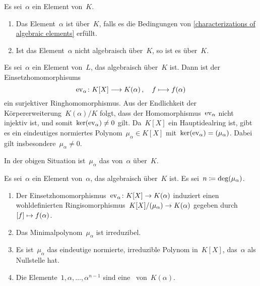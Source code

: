 \begin{definition}
  Es sei~$\alpha$ ein Element von~$K$.
  \begin{enumerate}
    \item
      Das Element~$\alpha$ ist  über~$K$, falls es die Bedingungen von \cref{characterizations of algebraic elements} erfüllt.
    \item
      Ist das Element~$\alpha$ nicht algebraisch über~$K$, so ist es  über~$K$.
  \end{enumerate}
\end{definition}

Es sei~$\alpha$ ein Element von~$L$, das algebraisch über~$K$ ist.
Dann ist der Einsetzhomomorphisums
\[
  \ev_\alpha
  \colon
  K[X] \to K(\alpha) \,,
  \quad
  f \mapsto f(\alpha)
\]
ein surjektiver Ringhomomorphismus.
Aus der Endlichkeit der Körpererweiterung~$K(\alpha)/K$ folgt, dass der Homomorphismus~$\operatorname{ev}_\alpha$ nicht injektiv ist, und somit~$\ker(\operatorname{ev}_\alpha) \neq 0$ gilt.
Da~$K[X]$ ein Hauptidealring ist, gibt es ein eindeutiges normiertes Polynom~$\mu_\alpha \in K[X]$ mit~$\ker(\operatorname{ev}_\alpha) = ( \mu_\alpha )$.
Dabei gilt insbesondere~$\mu_\alpha \neq 0$.

\begin{definition}
  In der obigen Situation ist~$\mu_\alpha$ das  von~$\alpha$ über~$K$.
\end{definition}

\begin{proposition}
  Es sei~$\alpha$ ein Element von~$\alpha$, das algebraisch über~$K$ ist.
  Es sei~$n \coloneqq \deg(\mu_\alpha)$.
  \begin{enumerate}
    \item
      Der Einsetzhomomorphismus~$\ev_\alpha \colon K[X] \to K(\alpha)$ induziert einen wohldefinierten Ringisomorphismus~$K[X] / \genideal{\mu_\alpha} \to K(\alpha)$ gegeben durch~$\class{f} \mapsto f(\alpha)$.
    \item
      Das Minimalpolynom~$\mu_\alpha$ ist irreduzibel.
    \item
      Es ist~$\mu_\alpha$ das eindeutige normierte, irreduzible Polynom in~$K[X]$, das~$\alpha$ als Nullstelle hat.
    \item
      Die Elemente~$1, \alpha, \dotsc, \alpha^{n-1}$ sind eine~ von~$K(\alpha)$.
  \end{enumerate}
\end{proposition}





